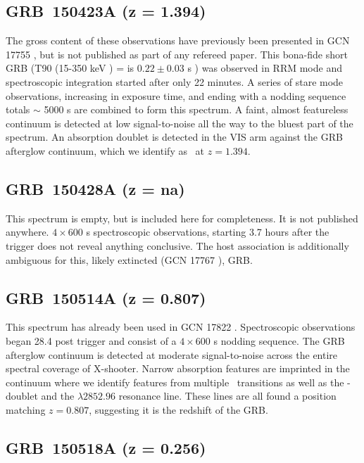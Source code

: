 \documentclass{aa}    %
\begin{document}
\subsection{GRB~150423A (z = 1.394)}\label{150423}

The gross content of these observations have previously been presented in GCN
17755 \citep{GCN17755}, but is not published as part of any refereed paper. This
bona-fide short GRB (T90 (15-350 keV ) = is $ 0.22 \pm 0.03$ s \citep{Lien2016})
was observed in RRM mode and spectroscopic integration started after only 22
minutes. A series of stare mode observations, increasing in exposure time, and
ending with a nodding sequence totals $\sim$ 5000 s are combined to form this
spectrum. A faint, almost featureless continuum is detected at low
signal-to-noise all the way to the bluest part of the spectrum. An absorption
doublet is detected in the VIS arm against the GRB afterglow continuum, which we
identify as \mgii~at $z = 1.394$.

\subsection{GRB~150428A (z = na)}	\label{150428}

This spectrum is empty, but is included here for completeness. It is not
published anywhere. $4\times600$ s spectroscopic observations, starting 3.7
hours after the trigger does not reveal anything conclusive. The host
association is additionally ambiguous for this, likely extincted (GCN 17767
\citep{GCN17767}), GRB.

\subsection{GRB~150514A (z = 0.807)}\label{150514}

This spectrum has already been used in GCN 17822 \citep{GCN17822}. Spectroscopic
observations began 28.4 post trigger and consist of a $4 \times 600$ s nodding
sequence. The GRB afterglow continuum is detected at moderate signal-to-noise
across the entire spectral coverage of X-shooter. Narrow absorption features are
imprinted in the continuum where we identify features from multiple
\feii~transitions as well as the \mgii-doublet and the \mgi$\lambda2852.96$
resonance line. These lines are all found a position matching $z = 0.807$,
suggesting it is the redshift of the GRB.

\subsection{GRB~150518A (z = 0.256)}\label{150518}
\end{document}
